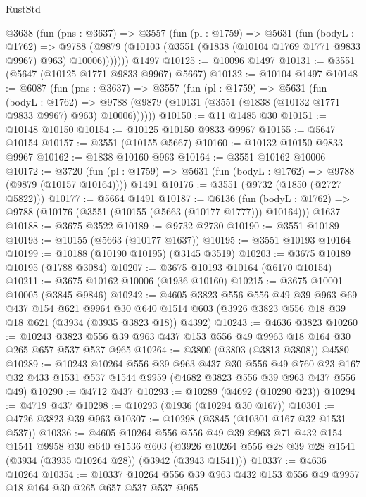 \begin{lexlean}{RustStd}
\begin{coremodule}
    @3638
      (fun (pns : @3637) =>
      @3557
        (fun (pl : @1759) =>
        @5631
          (fun (bodyL : @1762) =>
          @9788 (@9879 (@10103 (@3551 (@1838 (@10104 @1769 @1771 @9833 @9967) @963) @10006)))))))
    @1497
@10125 := @10096 @1497
@10131 := @3551 (@5647 (@10125 @1771 @9833 @9967) @5667)
@10132 := @10104 @1497
@10148 := @6087
    (fun (pns : @3637) =>
    @3557
      (fun (pl : @1759) =>
      @5631
        (fun (bodyL : @1762) =>
        @9788 (@9879 (@10131 (@3551 (@1838 (@10132 @1771 @9833 @9967) @963) @10006))))))
@10150 := @11 @1485 @30
@10151 := @10148 @10150
@10154 := @10125 @10150 @9833 @9967
@10155 := @5647 @10154
@10157 := @3551 (@10155 @5667)
@10160 := @10132 @10150 @9833 @9967
@10162 := @1838 @10160 @963
@10164 := @3551 @10162 @10006
@10172 := @3720
    (fun (pl : @1759) => @5631 (fun (bodyL : @1762) => @9788 (@9879 (@10157 @10164))))
    @1491
@10176 := @3551 (@9732 (@1850 (@2727 @5822)))
@10177 := @5664 @1491
@10187 := @6136
    (fun (bodyL : @1762) => @9788 (@10176 (@3551 (@10155 (@5663 (@10177 @1777))) @10164)))
    @1637
@10188 := @3675 @3522
@10189 := @9732 @2730
@10190 := @3551 @10189
@10193 := @10155 (@5663 (@10177 @1637))
@10195 := @3551 @10193 @10164
@10199 := @10188 (@10190 @10195) (@3145 @3519)
@10203 := @3675 @10189 @10195 (@1788 @3084)
@10207 := @3675 @10193 @10164 (@6170 @10154)
@10211 := @3675 @10162 @10006 (@1936 @10160)
@10215 := @3675 @10001 @10005 (@3845 @9846)
@10242 := @4605
    @3823
    @556
    @556
    @49
    @39
    @963
    @69
    @437
    @154
    @621
    @9964
    @30
    @640
    @1514
    @603
    (@3926 @3823 @556 @18 @39 @18 @621 (@3934 (@3935 @3823 @18)) @4392)
@10243 := @4636 @3823
@10260 := @10243 @3823 @556 @39 @963 @437 @153 @556 @49 @9963 @18 @164 @30 @265 @657 @537 @537 @965
@10264 := @3800 (@3803 (@3813 @3808)) @4580
@10289 := @10243
    @10264
    @556
    @39
    @963
    @437
    @30
    @556
    @49
    @760
    @23
    @167
    @32
    @433
    @1531
    @537
    @1544
    @9959
    (@4682 @3823 @556 @39 @963 @437 @556 @49)
@10290 := @4712 @437
@10293 := @10289 (@4692 (@10290 @23))
@10294 := @4719 @437
@10298 := @10293 (@1936 (@10294 @30 @167))
@10301 := @4726 @3823 @39 @963
@10307 := @10298 (@3845 (@10301 @167 @32 @1531 @537))
@10336 := @4605
    @10264
    @556
    @556
    @49
    @39
    @963
    @71
    @432
    @154
    @1541
    @9958
    @30
    @640
    @1536
    @603
    (@3926 @10264 @556 @28 @39 @28 @1541 (@3934 (@3935 @10264 @28)) (@3942 (@3943 @1541)))
@10337 := @4636 @10264
@10354 := @10337 @10264 @556 @39 @963 @432 @153 @556 @49 @9957 @18 @164 @30 @265 @657 @537 @537 @965

\end{coremodule}
\end{lexlean}
